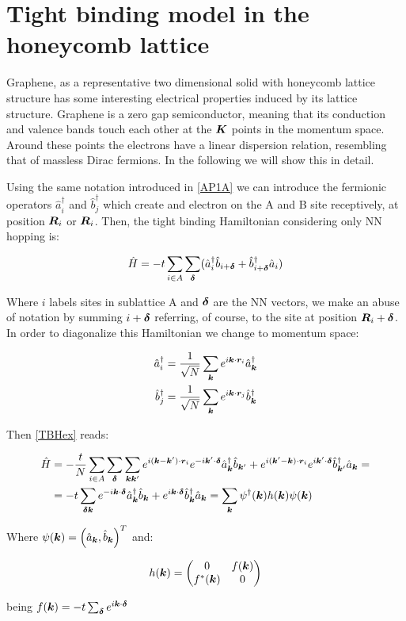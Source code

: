 \chapter{Tight binding model in the honeycomb lattice}
\label{APD}

Graphene, as a representative two dimensional solid with honeycomb lattice structure has some interesting electrical properties induced by its lattice structure. Graphene is a zero gap semiconductor, meaning that its conduction and valence bands touch each other at the $\boldsymbol{K}$ points in the momentum space. Around these points the electrons have a linear dispersion relation, resembling that of massless Dirac fermions. In the following we will show this in detail.

Using the same notation introduced in \ref{AP1A} we can introduce the fermionic operators $\hat{a}^\dagger_i$ and $\hat{b}^\dagger_j$ which create and electron on the A and B site receptively, at position $\boldsymbol{R}_i$ or $\boldsymbol{R}_i$. Then, the tight binding Hamiltonian considering only NN hopping is:

\begin{equation}
\label{TBHex}
\hat{H} = -t\sum_{i \in A}\sum_{\boldsymbol{\delta}} (\hat{a}^\dagger_i\hat{b}_{i+\boldsymbol{\delta}} + \hat{b}^\dagger_{i+\boldsymbol{\delta}}\hat{a}_i)
\end{equation}

Where $i$ labels sites in sublattice A and $\boldsymbol{\delta}$ are the NN vectors, we make an abuse of notation by summing $i+\boldsymbol{\delta}$ referring, of course, to the site at position $\boldsymbol{R}_i+\boldsymbol{\delta}$. In order to diagonalize this Hamiltonian we change to momentum space:

\begin{align}
\hat{a}^\dagger_i &= \frac{1}{\sqrt{N}} \sum_{\boldsymbol{k}} e^{i\boldsymbol{k}\cdot\boldsymbol{r}_i}\hat{a}^\dagger_{\boldsymbol{k}} \\
\hat{b}^\dagger_j &= \frac{1}{\sqrt{N}} \sum_{\boldsymbol{k}} e^{i\boldsymbol{k}\cdot\boldsymbol{r}_j}\hat{b}^\dagger_{\boldsymbol{k}} 
\end{align}

Then \ref{TBHex} reads:

\begin{align*}
\hat{H} &= -\frac{t}{N} \sum_{i \in A}\sum_{\boldsymbol{\delta}} \sum_{\boldsymbol{k}\boldsymbol{k}'} e^{i(\boldsymbol{k}-\boldsymbol{k}')\cdot\boldsymbol{r}_i}e^{-i\boldsymbol{k}'\cdot\boldsymbol{\delta}} \hat{a}^\dagger_{\boldsymbol{k}}\hat{b}_{\boldsymbol{k}'} + e^{i(\boldsymbol{k}'-\boldsymbol{k})\cdot\boldsymbol{r}_i}e^{i\boldsymbol{k}'\cdot\boldsymbol{\delta}} \hat{b}^\dagger_{\boldsymbol{k}'}\hat{a}_{\boldsymbol{k}} = \\
&= -t \sum_{\boldsymbol{\delta}\boldsymbol{k}} e^{-i\boldsymbol{k}\cdot\boldsymbol{\delta}} \hat{a}^\dagger_{\boldsymbol{k}}\hat{b}_{\boldsymbol{k}} +e^{i\boldsymbol{k}\cdot\boldsymbol{\delta}} \hat{b}^\dagger_{\boldsymbol{k}}\hat{a}_{\boldsymbol{k}} = \sum_{\boldsymbol{k}} \psi^\dagger(\boldsymbol{k})h(\boldsymbol{k})\psi(\boldsymbol{k})
\end{align*}

Where $\psi(\boldsymbol{k}) = \left( \hat{a}_{\boldsymbol{k}}, \hat{b}_{\boldsymbol{k}} \right)^T$ and:

\begin{equation}
h(\boldsymbol{k}) = \begin{pmatrix}
    0 & f(\boldsymbol{k}) \\
    f^*(\boldsymbol{k}) & 0
\end{pmatrix}
\end{equation}

being $f(\boldsymbol{k}) = -t\sum_{\boldsymbol{\delta}} e^{i\boldsymbol{k}\cdot\boldsymbol{\delta}}$